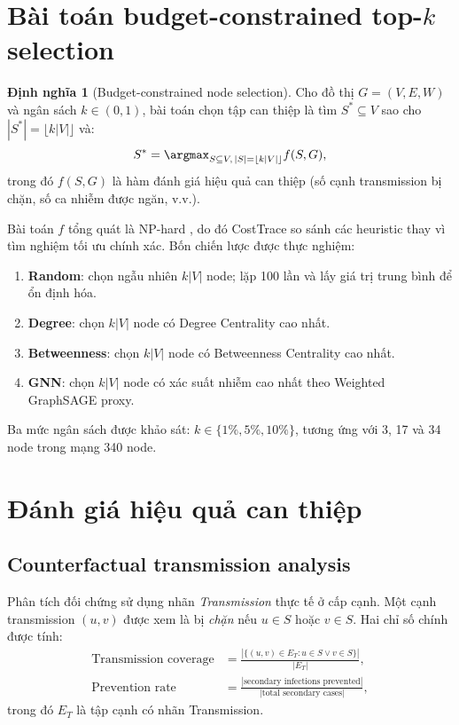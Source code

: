 \documentclass[12pt,a4paper]{report}
\theoremstyle{definition}
\newtheorem{definition}{Định nghĩa}[chapter]
\begin{document}
\section{Bài toán budget-constrained top-\texorpdfstring{$k$}{k} selection}

\begin{definition}[Budget-constrained node selection]
Cho đồ thị $G=(V,E,W)$ và ngân sách $k \in (0,1)$, bài toán chọn tập can thiệp là tìm $S^* \subseteq V$ sao cho $|S^*| = \lfloor k|V| \rfloor$ và:
\begin{equation}
  S^* = \argmax_{S \subseteq V,\, |S|=\lfloor k|V|\rfloor} f(S, G),
  \label{eq:topk}
\end{equation}
trong đó $f(S, G)$ là hàm đánh giá hiệu quả can thiệp (số cạnh transmission bị chặn, số ca nhiễm được ngăn, v.v.).
\end{definition}

Bài toán $f$ tổng quát là NP-hard \cite{kempe2003}, do đó CostTrace so sánh các heuristic thay vì tìm nghiệm tối ưu chính xác. Bốn chiến lược được thực nghiệm:
\begin{enumerate}[label=(\arabic*), itemsep=4pt]
  \item \textbf{Random}: chọn ngẫu nhiên $k|V|$ node; lặp 100 lần và lấy giá trị trung bình để ổn định hóa.
  \item \textbf{Degree}: chọn $k|V|$ node có Degree Centrality cao nhất.
  \item \textbf{Betweenness}: chọn $k|V|$ node có Betweenness Centrality cao nhất.
  \item \textbf{GNN}: chọn $k|V|$ node có xác suất nhiễm cao nhất theo Weighted GraphSAGE proxy.
\end{enumerate}
Ba mức ngân sách được khảo sát: $k \in \{1\%, 5\%, 10\%\}$, tương ứng với 3, 17 và 34 node trong mạng 340 node.

\section{Đánh giá hiệu quả can thiệp}

\subsection{Counterfactual transmission analysis}

Phân tích đối chứng sử dụng nhãn \textit{Transmission} thực tế ở cấp cạnh. Một cạnh transmission $(u,v)$ được xem là bị \textit{chặn} nếu $u \in S$ hoặc $v \in S$. Hai chỉ số chính được tính:
\begin{align}
  \text{Transmission coverage} &= \frac{|\{(u,v) \in E_T : u \in S \lor v \in S\}|}{|E_T|}, \label{eq:trans_coverage}\\
  \text{Prevention rate} &= \frac{|\text{secondary infections prevented}|}{|\text{total secondary cases}|}, \label{eq:prevention_rate}
\end{align}
trong đó $E_T$ là tập cạnh có nhãn Transmission.
\end{document}
